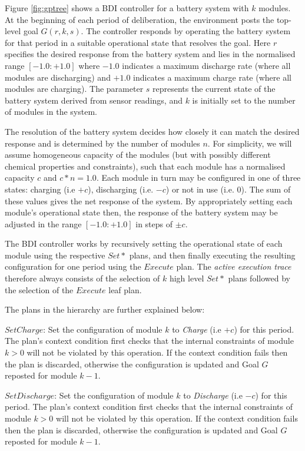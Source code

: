 Figure \ref{fig:gptree} shows a BDI controller for a battery system with $k$ modules. At the beginning of each period of deliberation, the environment posts the top-level goal $G(r,k,s)$. The controller responds by operating the battery system for that period in a suitable operational state that resolves the goal. Here $r$ specifies the desired response from the battery system and lies in the normalised range $[-1.0:+1.0]$ where $-1.0$ indicates a maximum discharge rate (where all modules are discharging) and $+1.0$ indicates a maximum charge rate (where all modules are charging). The parameter $s$ represents the current state of the battery system derived from sensor readings, and $k$ is initially set to the number of modules in the system. 

The resolution of the battery system decides how closely it can match the desired response and is determined by the number of modules $n$. For simplicity, we will assume homogeneous capacity of the modules (but with possibly different chemical properties and constraints), such that each module has a normalised capacity $c$ and $c*n=1.0$. Each module in turn may be configured in one of three states: charging (i.e $+c$), discharging (i.e. $-c$) or not in use (i.e. $0$). The sum of these values gives the net response of the system. By appropriately setting each module's operational state then, the response of the battery system may be adjusted in the range $[-1.0:+1.0]$ in steps of $\pm c$.

The BDI controller works by recursively setting the operational state of each module using the respective $Set*$ plans, and then finally executing the resulting configuration for one period using the $Execute$ plan. The {\em active execution trace} therefore always consists of the selection of $k$ high level $Set*$ plans followed by the selection of the $Execute$ leaf plan. 

The plans in the hierarchy are further explained below:

$SetCharge$: Set the configuration of module $k$ to {\em Charge} (i.e $+c$) for this period. The plan's context condition first checks that the internal constraints of module $k>0$ will not be violated by this operation. If the context condition fails then the plan is discarded, otherwise the configuration is updated and Goal $G$ reposted for module $k-1$.

$SetDischarge$: Set the configuration of module $k$ to {\em Discharge} (i.e $-c$) for this period. The plan's context condition first checks that the internal constraints of module $k>0$ will not be violated by this operation. If the context condition fails then the plan is discarded, otherwise the configuration is updated and Goal $G$ reposted for module $k-1$.

